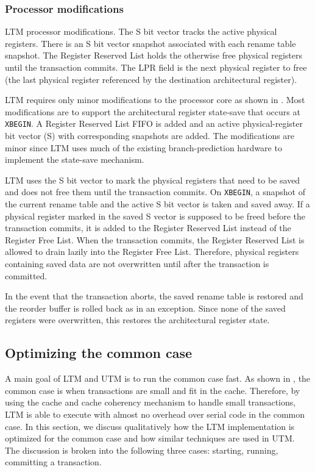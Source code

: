 \subsubsection{Processor modifications}

%
{LTM processor modifications. The S bit vector tracks the active
 physical registers. There is an S bit vector snapshot associated with
 each rename table snapshot. The Register Reserved List holds the
 otherwise free physical registers until the transaction commits. The
 LPR field is the next physical register to free (the last physical
 register referenced by the destination architectural register).}
 

LTM requires only minor modifications to the processor core as shown
in . Most modifications are to support the
architectural register state-save that occurs at \texttt{XBEGIN}. A
Register Reserved List FIFO is added and an active physical-register
bit vector (S) with corresponding snapshots are added. The
modifications are minor since LTM uses much of the existing
branch-prediction hardware to implement the state-save mechanism.

LTM uses the S bit vector to mark the physical registers that need to
be saved and does not free them until the transaction commits. On
\texttt{XBEGIN}, a snapshot of the current rename table and the active
S bit vector is taken and saved away. If a physical register marked in
the saved S vector is supposed to be freed before the transaction
commits, it is added to the Register Reserved List instead of the
Register Free List. When the transaction commits, the Register
Reserved List is allowed to drain lazily into the Register Free
List. Therefore, physical registers containing saved data are not
overwritten until after the transaction is committed.

In the event that the transaction aborts, the saved rename table is
restored and the reorder buffer is rolled back as in an exception.
Since none of the saved registers were overwritten, this restores the
architectural register state.

\subsection{Optimizing the common case}

A main goal of LTM and UTM is to run the common case fast. As shown in
, the common case is when transactions are small
and fit in the cache. Therefore, by using the cache and cache
coherency mechanism to handle small transactions, LTM is able to
execute with almost no overhead over serial code in the common
case. In this section, we discuss qualitatively how the LTM
implementation is optimized for the common case and how similar
techniques are used in UTM. The discussion is broken into the
following three cases: starting, running, committing a transaction.

